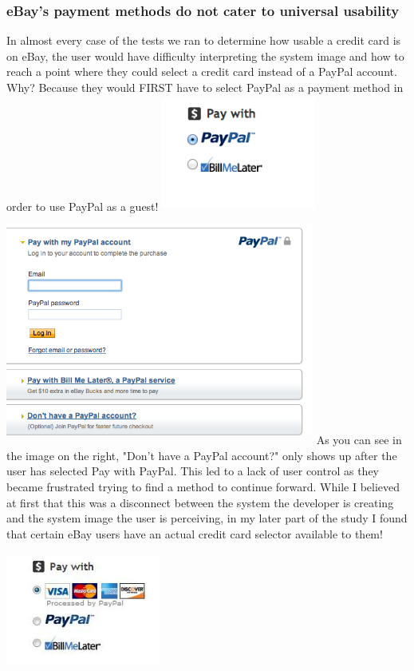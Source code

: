 \documentclass[11pt, oneside]{article}   	%
\begin{document}
\subsubsection{eBay's payment methods do not cater to universal usability}
In almost every case of the tests we ran to determine how usable a credit card is on eBay, the user would have difficulty interpreting the system image and how to reach a point where they could select a credit card instead of a PayPal account. Why? Because they would FIRST have to select PayPal as a payment method in order to use PayPal as a guest!
\includegraphics[width=2in, height=1.5in]{eBay2}
\includegraphics[width=4in, height=3in]{eBay3}
As you can see in the image on the right, "Don't have a PayPal account?" only shows up after the user has selected Pay with PayPal. This led to a lack of user control as they became frustrated trying to find a method to continue forward. While I believed at first that this was a disconnect between the system the developer is creating and the system image the user is perceiving, in my later part of the study I found that certain eBay users have an actual credit card selector available to them!

\includegraphics[width=2in, height=1.5in]{eBay4} 
\end{document}
